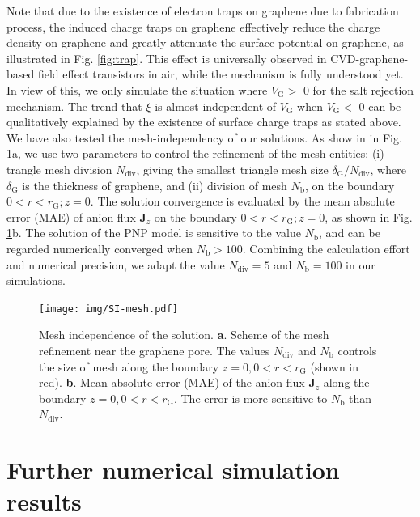 \documentclass[manuscript=suppinfo,email=true, hyperref=true, keywords=false]{achemso}
\newcommand{\Fig}{Fig.}
\begin{document}
Note that due to the existence of electron traps on graphene due to
fabrication process, the induced charge traps on graphene effectively
reduce the charge density on graphene and greatly attenuate the
surface potential on graphene, as illustrated in \Fig
\ref{fig:trap}. This effect is universally observed in
CVD-graphene-based field effect transistors in air, while the
mechanism is fully understood yet. In view of this, we only simulate
the situation where $V_{\mathrm{G}}>$ 0 for the salt rejection
mechanism. The trend that $\xi$ is almost independent of
$V_{\mathrm{G}}$ when $V_{\mathrm{G}}<$ 0 can be qualitatively
explained by the existence of surface charge traps as stated above.
We have also tested the mesh-independency of our solutions. As show in
in \Fig{} \ref{fig:mesh}a, we use two parameters to control the
refinement of the mesh entities: (i) trangle mesh division
$N_{\mathrm{div}}$, giving the smallest triangle mesh size
$\delta_{\mathrm{G}} / N_{\mathrm{div}}$, where $\delta_{\mathrm{G}}$
is the thickness of graphene, and (ii) division of mesh
$N_{\mathrm{b}}$, on the boundary $0<r<r_{\mathrm{G}};z=0$. The
solution convergence is evaluated by the mean absolute error (MAE) of
anion flux $\boldsymbol{J}_{z}$ on the boundary
$0<r<r_{\mathrm{G}};z=0$, as shown in \Fig{}
\ref{fig:mesh}b. The solution of the PNP model is sensitive to the
value $N_{\mathrm{b}}$, and can be regarded numerically converged when
$N_{\mathrm{b}}>100$. Combining the calculation effort and numerical
precision, we adapt the value $N_{\mathrm{div}}=5$ and
$N_{\mathrm{b}}=100$ in our simulations.

\begin{figure}[htbp]
  \centering
  \texttt{[image: img/SI-mesh.pdf]}
  \caption{Mesh independence of the solution. \textbf{a}. Scheme of
    the mesh refinement near the graphene pore. The values
    $N_{\mathrm{div}}$ and $N_{\mathrm{b}}$ controls the size of mesh
    along the boundary $z=0, 0<r<r_{\mathrm{G}}$ (shown in
    red). \textbf{b}. Mean absolute error (MAE) of the anion flux
    $\boldsymbol{J}_{z}$ along the boundary $z=0,
    0<r<r_{\mathrm{G}}$. The error is more sensitive to
    $N_{\mathrm{b}}$ than $N_{\mathrm{div}}$.}
  \label{fig:mesh}
\end{figure}

\section{Further numerical simulation results}
\label{sec:simu-res}
\end{document}
